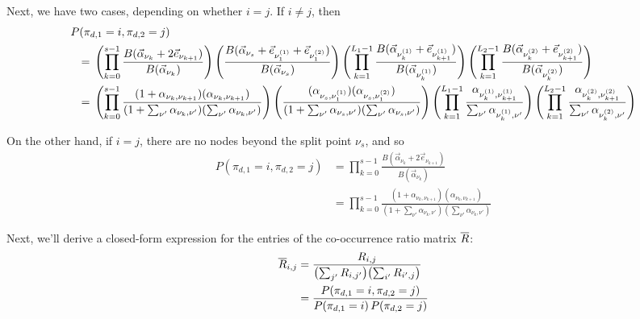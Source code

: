 \documentclass{article}
\theoremstyle{definition}
\begin{document}
Next, we have two cases, depending on whether $i = j$.
If $i \neq j$, then
\begin{align*}
\MoveEqLeft
P(\pi_{d,1} = i, \pi_{d,2} = j) \\
={}&
\left(
  \prod_{k=0}^{s-1}
  \frac{B(\vec\alpha_{\nu_k} + 2 \vec e_{\nu_{k+1}})}
       {B(\vec\alpha_{\nu_k})}
\right)
\left(
  \frac{B(\vec\alpha_{\nu_s} + \vec e_{\nu^{(1)}_{1}} + \vec e_{\nu^{(2)}_{1}})}
       {B(\vec\alpha_{\nu_s})}
\right)
\left(
  \prod_{k=1}^{L_1-1}
  \frac{B(\vec\alpha_{\nu^{(1)}_{k}} + \vec e_{\nu^{(1)}_{k+1}})}
       {B(\vec\alpha_{\nu^{(1)}_{k}})}
\right)
\left(
  \prod_{k=1}^{L_2-1}
  \frac{B(\vec\alpha_{\nu^{(2)}_{k}} + \vec e_{\nu^{(2)}_{k+1}})}
       {B(\vec\alpha_{\nu^{(2)}_{k}})}
\right)
\\
={}&
\left(
  \prod_{k=0}^{s-1}
  \frac{(1 + \alpha_{\nu_k,\nu_{k+1}}) (\alpha_{\nu_k,\nu_{k+1}})}
       {(1 + \sum_{\nu'} \alpha_{\nu_k,\nu'}) (\sum_{\nu'} \alpha_{\nu_k,\nu'})}
\right)
\left(
  \frac{(\alpha_{\nu_s,\nu^{(1)}_{1}}) (\alpha_{\nu_s,\nu^{(2)}_{1}})}
       {(1 + \sum_{\nu'} \alpha_{\nu_s,\nu'}) (\sum_{\nu'} \alpha_{\nu_s,\nu'})}
\right)
\left(
  \prod_{k=1}^{L_1-1}
  \frac{\alpha_{\nu^{(1)}_{k}, \nu^{(1)}_{k+1}}}
       {\sum_{\nu'} \alpha_{\nu^{(1)}_{k}, \nu'}}
\right)
\left(
  \prod_{k=1}^{L_2-1}
  \frac{\alpha_{\nu^{(2)}_{k}, \nu^{(2)}_{k+1}}}
       {\sum_{\nu'} \alpha_{\nu^{(2)}_{k}, \nu'}}
\right)
\end{align*}

On the other hand, if $i = j$, there are no nodes beyond the split point $\nu_s$, and so
\begin{align*}
P(\pi_{d,1} = i, \pi_{d,2} = j)
&=
  \prod_{k=0}^{s-1}
  \frac{B(\vec\alpha_{\nu_k} + 2 \vec e_{\nu_{k+1}})}
       {B(\vec\alpha_{\nu_k})}
\\
&=
\prod_{k=0}^{s-1}
\frac{(1 + \alpha_{\nu_k,\nu_{k+1}}) (\alpha_{\nu_k,\nu_{k+1}})}
     {(1 + \sum_{\nu'} \alpha_{\nu_k,\nu'}) (\sum_{\nu'} \alpha_{\nu_k,\nu'})}
\end{align*}

Next, we'll derive a closed-form expression for the entries of the co-occurrence ratio matrix $\overline{R}$:
\begin{align*}
\overline{R}_{i,j}
&=
\frac{R_{i,j}}{ \bigl( \sum_{j'} R_{i,j'} \bigr) \bigl( \sum_{i'} R_{i',j} \bigr) }
\\
&=
\frac{P(\pi_{d,1} = i, \pi_{d,2} = j)}
     {P(\pi_{d,1} = i) \, P(\pi_{d,2} = j)}
\end{align*}
\end{document}
